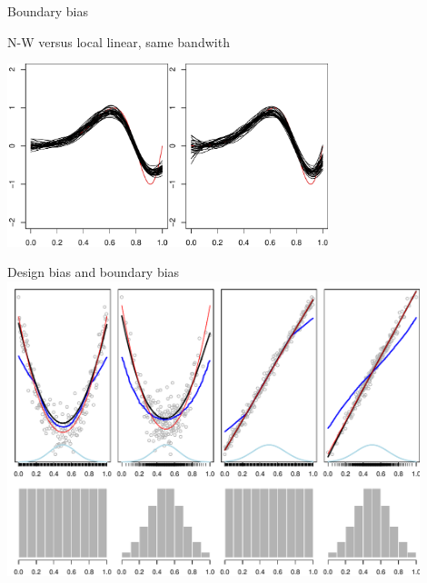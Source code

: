 \documentclass{beamer}\usepackage[]{graphicx}\usepackage[]{color}
\makeatletter
\newenvironment{kframe}{%
 \def\at@end@of@kframe{}%
 \ifinner\ifhmode%
  \def\at@end@of@kframe{\end{minipage}}%
  \begin{minipage}{\columnwidth}%
 \fi\fi%
 \def\FrameCommand##1{\hskip\@totalleftmargin \hskip-\fboxsep
 \colorbox{shadecolor}{##1}\hskip-\fboxsep
     \hskip-\linewidth \hskip-\@totalleftmargin \hskip\columnwidth}%
 \MakeFramed {\advance\hsize-\width
   \@totalleftmargin\z@ \linewidth\hsize
   \@setminipage}}%
 {\par\unskip\endMakeFramed%
 \at@end@of@kframe}
\newenvironment{knitrout}{}{} %
\makeatother
\begin{document}
\begin{frame}{Boundary bias}

N-W versus local linear, same bandwith
\begin{center}
\begin{knitrout}
\color{fgcolor}
\includegraphics[width=0.7\textwidth]{figure/020-regression-1unnamed-chunk-16-1} 

\end{knitrout}
\end{center}

\end{frame}


\begin{frame}{Design bias and boundary bias}
\begin{knitrout}
\color{fgcolor}
\includegraphics[width=0.9\textwidth]{figure/020-regression-1unnamed-chunk-17-1} 

\end{knitrout}
\end{frame}




\begin{knitrout}
\color{fgcolor}\begin{kframe}


{\ttfamily\noindent\bfseries{}}\end{kframe}
\end{knitrout}
\end{document}

